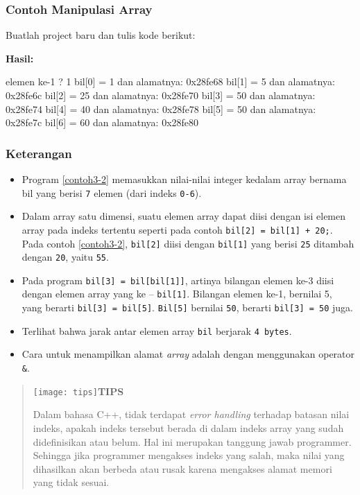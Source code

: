 \subsubsection*{Contoh  Manipulasi Array}

Buatlah project baru dan tulis kode berikut:




\textbf{Hasil:}

\begin{lcverbatim}
elemen ke-1 ? 1
bil[0] = 1 dan alamatnya: 0x28fe68
bil[1] = 5 dan alamatnya: 0x28fe6c
bil[2] = 25 dan alamatnya: 0x28fe70
bil[3] = 50 dan alamatnya: 0x28fe74
bil[4] = 40 dan alamatnya: 0x28fe78
bil[5] = 50 dan alamatnya: 0x28fe7c
bil[6] = 60 dan alamatnya: 0x28fe80
\end{lcverbatim}

\subsubsection*{Keterangan}

\begin{itemize}

\item
  Program \ref{contoh3-2} memasukkan nilai-nilai integer kedalam array bernama
  bil yang berisi \texttt{7} elemen (dari indeks \texttt{0-6}).
\item
  Dalam array satu dimensi, suatu elemen array dapat diisi dengan isi
  elemen array pada indeks tertentu seperti pada contoh
  \texttt{bil{[}2{]}\ =\ bil{[}1{]}\ +\ 20;}. Pada contoh \ref{contoh3-2},
  \texttt{bil{[}2{]}} diisi dengan \texttt{bil{[}1{]}} yang berisi
  \texttt{25} ditambah dengan \texttt{20}, yaitu \texttt{55}.
\item
  Pada program \texttt{bil{[}3{]}\ =\ bil{[}bil{[}1{]}{]}}, artinya
  bilangan elemen ke-3 diisi dengan elemen array yang ke --
  \texttt{bil{[}1{]}}. Bilangan elemen ke-1, bernilai 5, yang berarti
  \texttt{bil{[}3{]}\ =\ bil{[}5{]}}. \texttt{Bil{[}5{]}} bernilai
  \texttt{50}, berarti \texttt{bil{[}3{]}\ =\ 50} juga.
\item
  Terlihat bahwa jarak antar elemen array \texttt{bil} berjarak
  \texttt{4\ bytes}.
\item
  Cara untuk menampilkan alamat \emph{array} adalah dengan menggunakan
  operator \texttt{\&}.
\end{itemize}
\begin{quotation}
\texttt{[image: tips]}\textbf{TIPS} 

Dalam
bahasa C++, tidak terdapat \emph{error handling} terhadap batasan nilai
indeks, apakah indeks tersebut berada di dalam indeks array yang sudah
didefinisikan atau belum. Hal ini merupakan tanggung jawab programmer.
Sehingga jika programmer mengakses indeks yang salah, maka nilai yang
dihasilkan akan berbeda atau rusak karena mengakses alamat memori yang
tidak sesuai.
\end{quotation}
 

